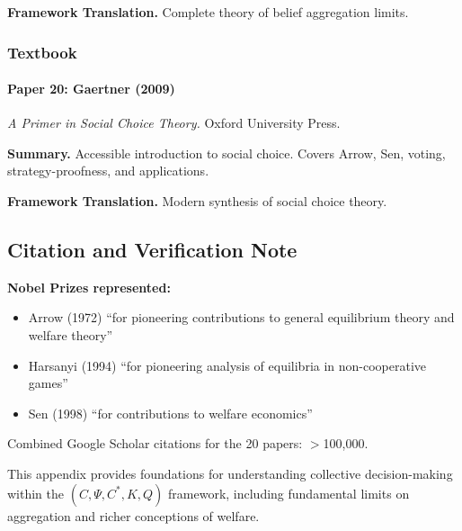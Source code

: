 \textbf{Framework Translation.}
Complete theory of belief aggregation limits.

\subsubsection{Textbook}

\paragraph{Paper 20: Gaertner (2009)}

\textit{A Primer in Social Choice Theory.}
Oxford University Press.

\textbf{Summary.}
Accessible introduction to social choice. Covers Arrow, Sen, voting, 
strategy-proofness, and applications.

\textbf{Framework Translation.}
Modern synthesis of social choice theory.

\subsection{Citation and Verification Note}

\textbf{Nobel Prizes represented:}
\begin{itemize}
    \item Arrow (1972) ``for pioneering contributions to general equilibrium theory and welfare theory''
    \item Harsanyi (1994) ``for pioneering analysis of equilibria in non-cooperative games''
    \item Sen (1998) ``for contributions to welfare economics''
\end{itemize}

Combined Google Scholar citations for the 20 papers: $>$100,000.

This appendix provides foundations for understanding collective decision-making 
within the $(C, \Psi, C^*, K, Q)$ framework, including fundamental limits on 
aggregation and richer conceptions of welfare.

